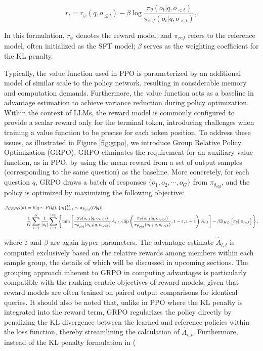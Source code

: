 \begin{equation}
    r_{t} = r_\varphi(q, o_{\le t}) - \beta \log\frac{\pi_{\theta}(o_{t}|q, o_{<t})}{\pi_{ref}(o_{t}|q, o_{<t})},
\label{eq:PPO-reward}
\end{equation}

In this formulation, $r_\varphi$ denotes the reward model, and $\pi_{ref}$ refers to the reference model, often initialized as the SFT model; $\beta$ serves as the weighting coefficient for the KL penalty.

Typically, the value function used in PPO is parameterized by an additional model of similar scale to the policy network, resulting in considerable memory and computation demands. Furthermore, the value function acts as a baseline in advantage estimation to achieve variance reduction during policy optimization. Within the context of LLMs, the reward model is commonly configured to provide a scalar reward only for the terminal token, introducing challenges when training a value function to be precise for each token position. To address these issues, as illustrated in Figure \ref{fig:grpo}, we introduce Group Relative Policy Optimization (GRPO). GRPO eliminates the requirement for an auxiliary value function, as in PPO, by using the mean reward from a set of output samples (corresponding to the same question) as the baseline. More concretely, for each question $q$, GRPO draws a batch of responses $\{o_1, o_2, \cdots, o_G\}$ from $\pi_{\theta_{old}}$, and the policy is optimized by maximizing the following objective:

\begin{equation}
\footnotesize
\begin{split}
    \mathcal{J}_{GRPO}(\theta) &= \mathbb{E}{[q \sim P(Q), \{o_i\}_{i=1}^G \sim \pi_{\theta_{old}}(O|q)]}  \\
    & \frac{1}{G}\sum_{i=1}^G\frac{1}{|o_i|} \sum_{t=1}^{|o_i|} \left\{ \min \left[ \frac{\pi_\theta(o_{i,t} | q, o_{i,<t})}{\pi_{\theta_{old}}(o_{i,t} | q, o_{i,<t})} \hat{A}_{i,t}, \text{clip} \left( \frac{\pi_\theta(o_{i,t} | q, o_{i,<t})}{\pi_{\theta_{old}}(o_{i,t} | q, o_{i,<t})}, 1 - \varepsilon, 1 + \varepsilon \right)  \hat{A}_{i,t} \right] - \beta \mathbb{D}_{KL}\left[\pi_{\theta} || \pi_{ref}\right]\right\} ,
\end{split}
\label{eq:GRPO-obj}
\end{equation}

where $\varepsilon$ and $\beta$ are again hyper-parameters. The advantage estimate $\hat{A}_{i,t}$ is computed exclusively based on the relative rewards among members within each sample group, the details of which will be discussed in upcoming sections. The grouping approach inherent to GRPO in computing advantages is particularly compatible with the ranking-centric objectives of reward models, given that reward models are often trained on paired output comparisons for identical queries. It should also be noted that, unlike in PPO where the KL penalty is integrated into the reward term, GRPO regularizes the policy directly by penalizing the KL divergence between the learned and reference policies within the loss function, thereby streamlining the calculation of $\hat{A}_{i,t}$. Furthermore, instead of the KL penalty formulation in (\


